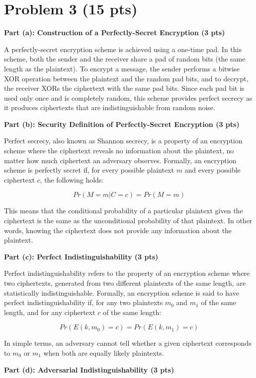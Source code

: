 \documentclass{article}
\begin{document}
\section*{Problem 3 (15 pts)}

\textbf{Part (a): Construction of a Perfectly-Secret Encryption (3 pts)}

A perfectly-secret encryption scheme is achieved using a one-time pad. In this scheme, both the sender and the receiver share a pad of random bits (the same length as the plaintext). To encrypt a message, the sender performs a bitwise XOR operation between the plaintext and the random pad bits, and to decrypt, the receiver XORs the ciphertext with the same pad bits. Since each pad bit is used only once and is completely random, this scheme provides perfect secrecy as it produces ciphertexts that are indistinguishable from random noise.

\textbf{Part (b): Security Definition of Perfectly-Secret Encryption (3 pts)}

Perfect secrecy, also known as Shannon secrecy, is a property of an encryption scheme where the ciphertext reveals no information about the plaintext, no matter how much ciphertext an adversary observes. Formally, an encryption scheme is perfectly secret if, for every possible plaintext $m$ and every possible ciphertext $c$, the following holds:

\[Pr(M = m | C = c) = Pr(M = m)\]

This means that the conditional probability of a particular plaintext given the ciphertext is the same as the unconditional probability of that plaintext. In other words, knowing the ciphertext does not provide any information about the plaintext. 

\textbf{Part (c): Perfect Indistinguishability (3 pts)}

Perfect indistinguishability refers to the property of an encryption scheme where two ciphertexts, generated from two different plaintexts of the same length, are statistically indistinguishable. Formally, an encryption scheme is said to have perfect indistinguishability if, for any two plaintexts $m_0$ and $m_1$ of the same length, and for any ciphertext $c$ of the same length:

\[Pr(E(k, m_0) = c) = Pr(E(k, m_1) = c)\]

In simple terms, an adversary cannot tell whether a given ciphertext corresponds to $m_0$ or $m_1$ when both are equally likely plaintexts.

\textbf{Part (d): Adversarial Indistinguishability (3 pts)}
\end{document}
